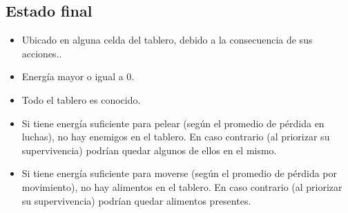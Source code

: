 \subsection{Estado final}
\begin{itemize}
\item Ubicado en alguna celda del tablero, debido a la consecuencia de sus acciones..
\item Energía mayor o igual a 0.
\item Todo el tablero es conocido.
\item Si tiene energía suficiente para pelear (según el promedio de pérdida en
luchas), no hay enemigos en el tablero. En caso contrario (al priorizar su
supervivencia) podrían quedar algunos de ellos en el mismo.
\item Si tiene energía suficiente para moverse (según el promedio de pérdida
por movimiento), no hay alimentos en el tablero. En caso contrario (al priorizar
su supervivencia) podrían quedar alimentos presentes.
\end{itemize}

